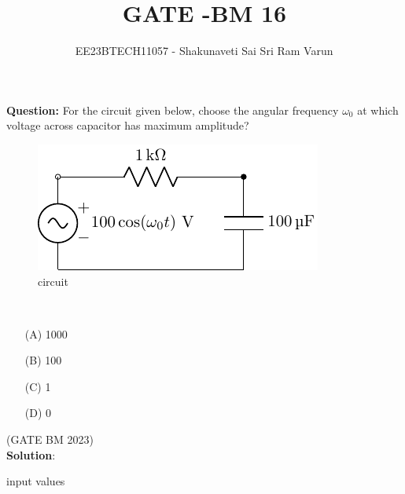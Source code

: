 \documentclass[journal,12pt,twocolumn]{IEEEtran}
\theoremstyle{remark}
\begin{document}

\vspace{3cm}

\title{GATE -BM 16}
\author{EE23BTECH11057 - Shakunaveti Sai Sri Ram Varun$^{}$%
}
\maketitle
\newpage
\bigskip
\vspace{2cm}
\textbf{Question: }
For the circuit given below, choose the angular frequency $ \omega_0$ at which voltage across capacitor has maximum amplitude?
\begin{figure}[h!]
    \includegraphics[width = \columnwidth]{figs/c_fig1.pdf}
    \caption{circuit }
    \centering
    \label{fig: bm_16_fig_1}
\end{figure}\\
\begin{enumerate}
    \item[(A)] 1000\\
    \item[(B)] 100\\
    \item[(C)] 1\\
    \item[(D)] 0   
\end{enumerate}
\hfill(GATE BM 2023)\\
\textbf{Solution}:\\
\begin{table}[htbp] 
\centering

\caption{input values}
\label{tab: table-bm16}
\end{table}
\end{document}
